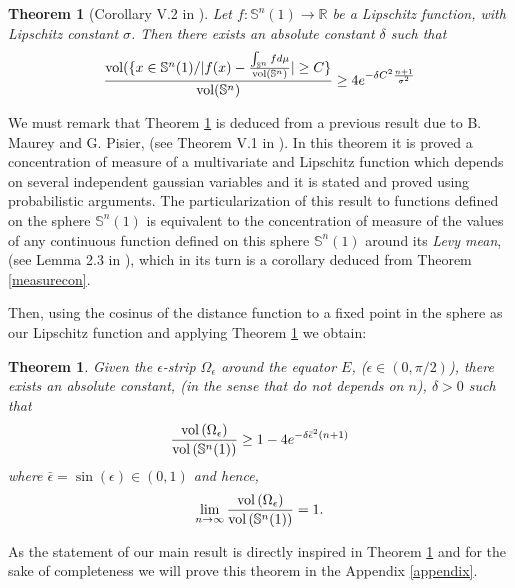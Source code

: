 \documentclass{amsart}
\newtheorem{theoremA}{Theorem}
\newtheorem{theorem}{Theorem}[section]
\theoremstyle{definition}
\theoremstyle{remark}
\newcommand{\erre}{\mathbb{R}}
\newcommand{\ese}{\mathbb{S}}
\begin{document}
\begin{theoremA}[Corollary V.2 in \cite{MS}]\label{thB}
Let $f: \ese^n(1) \rightarrow \erre$ be a Lipschitz function, with Lipschitz constant $\sigma$. Then there exists an absolute constant $\delta$ such that
\begin{equation}
\frac{{\rm vol}(\{ x \in \ese^n(1) / \vert f(x)- \frac{\int_{\ese^n} f d\mu}{{\rm vol}(\ese^n)}\vert\geq C\} }{{\rm vol}(\ese^n) } \geq 4 e^{-\delta C^2\frac{n+1}{\sigma^2}}
\end{equation}

\end{theoremA}
We must remark that Theorem \ref{thB} is deduced from a previous result due to B. Maurey and G. Pisier, (see Theorem V.1 in \cite{MS}). In this theorem it is proved a concentration of measure of a multivariate and Lipschitz function which depends on several independent gaussian variables and it is stated and proved using probabilistic arguments. The particularization of this result to  functions defined on the sphere $\ese^n(1)$ is equivalent to the concentration of measure of the values of any continuous function defined on this sphere $\ese^n(1)$ around its {\em Levy mean}, (see Lemma 2.3 in \cite{MS}), which in its turn is a corollary deduced from Theorem \ref{measurecon}. 


Then, using the cosinus of the distance function to a fixed point in the sphere as our Lipschitz function and applying Theorem \ref{thB} we obtain:

\begin{theorem}\label{teo:mitjana}
 Given the $\epsilon$-strip $\Omega_\epsilon$ around the equator $E$, ($\epsilon \in (0,\pi/2)$),  there exists an absolute constant, (in the sense that do not depends on $n$), $\delta>0$ such that
\begin{equation}\label{eq3}
\frac{{\rm vol}\left(\Omega_\epsilon\right)}{{\rm vol}\left(\mathbb{S}^n(1)\right)}\geq 1-4e^{-\delta\bar\epsilon^2(n+1)}
\end{equation}
 where $\bar\epsilon=\sin(\epsilon) \in (0,1)$ and hence,
 \begin{equation}\label{eq3.1}
\lim_{n\to \infty}\frac{{\rm vol}\left(\Omega_\epsilon\right)}{{\rm vol}\left(\mathbb{S}^n(1)\right)}=1.
\end{equation}   
\end{theorem}

 As  the statement of our main result is directly inspired in Theorem \ref{teo:mitjana} and for the sake of completeness we will prove this theorem in the Appendix \ref{appendix}.
\end{document}
